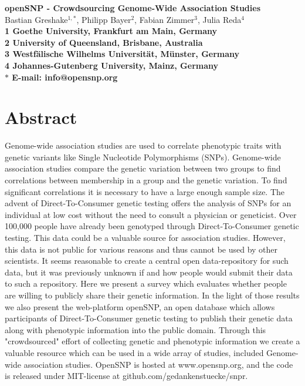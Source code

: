 \documentclass[10pt]{article}
\date{}
\begin{document}
\begin{flushleft}
{\Large
\textbf{openSNP - Crowdsourcing Genome-Wide Association Studies}
}
% 
\\
Bastian Greshake$^{1,\ast}$, 
Philipp Bayer$^{2}$, 
Fabian Zimmer$^{3}$,
Julia Reda$^{4}$
\\
\bf{1} Goethe University, Frankfurt am Main, Germany
\\
\bf{2} University of Queensland, Brisbane, Australia
\\
\bf{3} Westf\"alische Wilhelms Universit\"at, M\"unster, Germany
\\
\bf{4} Johannes-Gutenberg University, Mainz, Germany
\\
$\ast$ E-mail: info@opensnp.org
\end{flushleft}

\section*{Abstract}
Genome-wide association studies are used to correlate phenotypic traits with genetic variants like Single Nucleotide Polymorphisms (SNPs). Genome-wide association studies compare the genetic variation between two groups to find correlations between membership in a group and the genetic variation. To find significant correlations it is necessary to have a large enough sample size. The advent of Direct-To-Consumer genetic testing offers the analysis of SNPs for an individual at low cost without the need to consult a physician or geneticist. Over 100,000 people have already been genotyped through Direct-To-Consumer genetic testing. This data could be a valuable source for association studies. However, this data is not public for various reasons and thus cannot be used by other scientists. It seems reasonable to create a central open data-repository for such data, but it was previously unknown if and how people would submit their data to such a repository. Here we present a survey which evaluates whether people are willing to publicly share their genetic information. In the light of those results we also present the web-platform openSNP, an open database which allows participants of Direct-To-Consumer genetic testing to publish their genetic data along with phenotypic information into the public domain. Through this "crowdsourced" effort of collecting genetic and phenotypic information we create a valuable resource which can be used in a wide array of studies, included Genome-wide association studies. OpenSNP is hosted at www.opensnp.org, and the code is released under MIT-license at github.com/gedankenstuecke/snpr.
\end{document}
